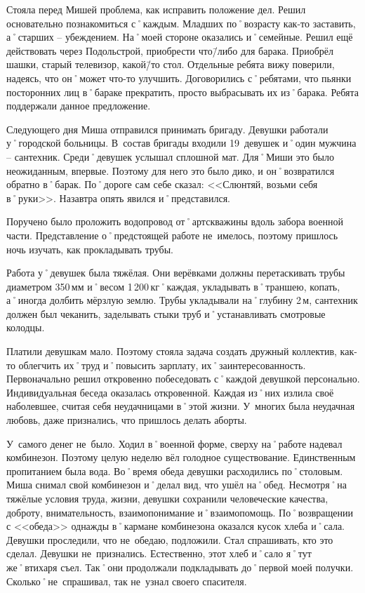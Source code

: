 Стояла перед Мишей проблема, как исправить положение дел. Решил основательно познакомиться с˚каждым. Младших по˚возрасту как-то заставить, а˚старших \--- убеждением. На˚моей стороне оказались и˚семейные. Решил ещё действовать через Подольстрой, приобрести что\=/либо для барака. Приобрёл шашки, старый телевизор, какой\=/то стол. Отдельные ребята вижу поверили, надеясь, что он˚может что-то улучшить. Договорились с˚ребятами, что пьянки посторонних лиц в˚бараке прекратить, просто выбрасывать их из˚барака. Ребята поддержали данное предложение. 

Следующего дня Миша отправился принимать бригаду. Девушки работали у˚городской больницы. В~состав бригады входили 19~девушек и˚один мужчина \--- сантехник. Среди˚девушек услышал сплошной мат. Для˚Миши это было неожиданным, впервые. Поэтому для него это было дико, и он˚возвратился обратно в˚барак. По˚дороге сам себе сказал: <<Слюнтяй, возьми себя в˚руки>>. Назавтра опять явился и˚представился. 

Поручено было проложить водопровод от˚артскважины вдоль забора военной части. Представление о˚предстоящей работе не~имелось, поэтому пришлось ночь изучать, как прокладывать трубы.

Работа у˚девушек была тяжёлая. Они верёвками должны перетаскивать трубы диаметром 350\,мм и˚весом 1\,200\,кг˚каждая, укладывать в˚траншею, копать, а˚иногда долбить мёрзлую землю. Трубы укладывали на˚глубину 2\,м, сантехник должен был чеканить, заделывать стыки труб и˚устанавливать смотровые колодцы.

Платили девушкам мало. Поэтому стояла задача создать дружный коллектив, как-то облегчить их˚труд и˚повысить зарплату, их˚заинтересованность. Первоначально решил откровенно побеседовать с˚каждой девушкой персонально. Индивидуальная беседа оказалась откровенной. Каждая из˚них излила своё наболевшее, считая себя неудачницами в˚этой жизни. У~многих была неудачная любовь, даже признались, что пришлось делать аборты.

У~самого денег не~было. Ходил в˚военной форме, сверху на˚работе надевал комбинезон. Поэтому целую неделю вёл голодное существование. Единственным пропитанием была вода. Во˚время обеда девушки расходились по˚столовым. Миша снимал свой комбинезон и˚делал вид, что ушёл на˚обед. Несмотря˚на тяжёлые условия труда, жизни, девушки сохранили человеческие качества, доброту, внимательность, взаимопонимание и˚взаимопомощь. По˚возвращении с <<обеда>> однажды в˚кармане комбинезона оказался кусок хлеба и˚сала. Девушки проследили, что не~обедаю, подложили. Стал спрашивать, кто это сделал. Девушки не~признались. Естественно, этот хлеб и˚сало я˚тут же˚втихаря съел. Так˚они продолжали подкладывать до˚первой моей получки. Сколько˚не~спрашивал, так не~узнал своего спасителя.

